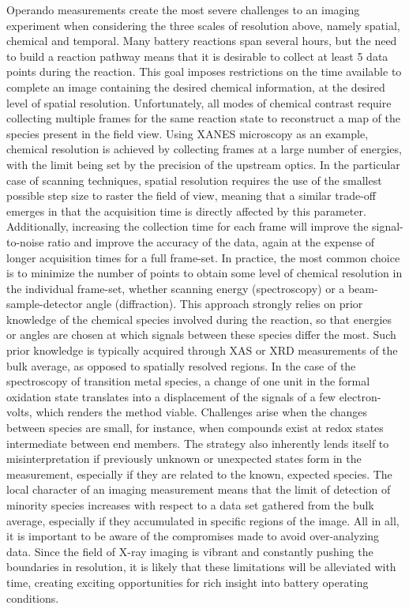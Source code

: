 \documentclass[journal=cmatex,manuscript=perspective]{achemso}
\begin{document}
Operando measurements create the most severe challenges to an imaging
experiment when considering the three scales of resolution above,
namely spatial, chemical and temporal. Many battery reactions span
several hours, but the need to build a reaction pathway means that it
is desirable to collect at least 5 data points during the
reaction. This goal imposes restrictions on the time available to
complete an image containing the desired chemical information, at the
desired level of spatial resolution. Unfortunately, all modes of
chemical contrast require collecting multiple frames for the same
reaction state to reconstruct a map of the species present in the
field view. Using XANES microscopy as an example, chemical resolution
is achieved by collecting frames at a large number of energies, with
the limit being set by the precision of the upstream optics. In the
particular case of scanning techniques, spatial resolution requires
the use of the smallest possible step size to raster the field of
view, meaning that a similar trade-off emerges in that the acquisition
time is directly affected by this parameter. Additionally, increasing
the collection time for each frame will improve the signal-to-noise
ratio and improve the accuracy of the data, again at the expense of
longer acquisition times for a full frame-set. In practice, the most
common choice is to minimize the number of points to obtain some level
of chemical resolution in the individual frame-set, whether scanning
energy (spectroscopy) or a beam-sample-detector angle
(diffraction). This approach strongly relies on prior knowledge of the
chemical species involved during the reaction, so that energies or
angles are chosen at which signals between these species differ the
most. Such prior knowledge is typically acquired through XAS or XRD
measurements of the bulk average, as opposed to spatially resolved
regions. In the case of the spectroscopy of transition metal species,
a change of one unit in the formal oxidation state translates into a
displacement of the signals of a few electron-volts, which renders the
method viable. Challenges arise when the changes between species are
small, for instance, when compounds exist at redox states intermediate
between end members. The strategy also inherently lends itself to
misinterpretation if previously unknown or unexpected states form in
the measurement, especially if they are related to the known, expected
species. The local character of an imaging measurement means that the
limit of detection of minority species increases with respect to a
data set gathered from the bulk average, especially if they
accumulated in specific regions of the image. All in all, it is
important to be aware of the compromises made to avoid over-analyzing
data. Since the field of X-ray imaging is vibrant and constantly
pushing the boundaries in resolution, it is likely that these
limitations will be alleviated with time, creating exciting
opportunities for rich insight into battery operating conditions.
\end{document}
